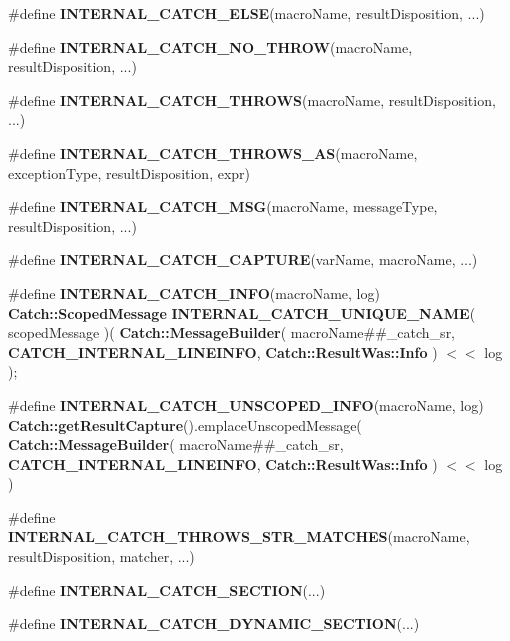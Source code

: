 \begin{DoxyCompactItemize}
\item 
\#define \textbf{ I\+N\+T\+E\+R\+N\+A\+L\+\_\+\+C\+A\+T\+C\+H\+\_\+\+E\+L\+SE}(macro\+Name,  result\+Disposition, ...)
\item 
\#define \textbf{ I\+N\+T\+E\+R\+N\+A\+L\+\_\+\+C\+A\+T\+C\+H\+\_\+\+N\+O\+\_\+\+T\+H\+R\+OW}(macro\+Name,  result\+Disposition, ...)
\item 
\#define \textbf{ I\+N\+T\+E\+R\+N\+A\+L\+\_\+\+C\+A\+T\+C\+H\+\_\+\+T\+H\+R\+O\+WS}(macro\+Name,  result\+Disposition, ...)
\item 
\#define \textbf{ I\+N\+T\+E\+R\+N\+A\+L\+\_\+\+C\+A\+T\+C\+H\+\_\+\+T\+H\+R\+O\+W\+S\+\_\+\+AS}(macro\+Name,  exception\+Type,  result\+Disposition,  expr)
\item 
\#define \textbf{ I\+N\+T\+E\+R\+N\+A\+L\+\_\+\+C\+A\+T\+C\+H\+\_\+\+M\+SG}(macro\+Name,  message\+Type,  result\+Disposition, ...)
\item 
\#define \textbf{ I\+N\+T\+E\+R\+N\+A\+L\+\_\+\+C\+A\+T\+C\+H\+\_\+\+C\+A\+P\+T\+U\+RE}(var\+Name,  macro\+Name, ...)
\item 
\#define \textbf{ I\+N\+T\+E\+R\+N\+A\+L\+\_\+\+C\+A\+T\+C\+H\+\_\+\+I\+N\+FO}(macro\+Name,  log)~\textbf{ Catch\+::\+Scoped\+Message} \textbf{ I\+N\+T\+E\+R\+N\+A\+L\+\_\+\+C\+A\+T\+C\+H\+\_\+\+U\+N\+I\+Q\+U\+E\+\_\+\+N\+A\+ME}( scoped\+Message )( \textbf{ Catch\+::\+Message\+Builder}( macro\+Name\#\#\+\_\+catch\+\_\+sr, \textbf{ C\+A\+T\+C\+H\+\_\+\+I\+N\+T\+E\+R\+N\+A\+L\+\_\+\+L\+I\+N\+E\+I\+N\+FO}, \textbf{ Catch\+::\+Result\+Was\+::\+Info} ) $<$$<$ log );
\item 
\#define \textbf{ I\+N\+T\+E\+R\+N\+A\+L\+\_\+\+C\+A\+T\+C\+H\+\_\+\+U\+N\+S\+C\+O\+P\+E\+D\+\_\+\+I\+N\+FO}(macro\+Name,  log)~\textbf{ Catch\+::get\+Result\+Capture}().emplace\+Unscoped\+Message( \textbf{ Catch\+::\+Message\+Builder}( macro\+Name\#\#\+\_\+catch\+\_\+sr, \textbf{ C\+A\+T\+C\+H\+\_\+\+I\+N\+T\+E\+R\+N\+A\+L\+\_\+\+L\+I\+N\+E\+I\+N\+FO}, \textbf{ Catch\+::\+Result\+Was\+::\+Info} ) $<$$<$ log )
\item 
\#define \textbf{ I\+N\+T\+E\+R\+N\+A\+L\+\_\+\+C\+A\+T\+C\+H\+\_\+\+T\+H\+R\+O\+W\+S\+\_\+\+S\+T\+R\+\_\+\+M\+A\+T\+C\+H\+ES}(macro\+Name,  result\+Disposition,  matcher, ...)
\item 
\#define \textbf{ I\+N\+T\+E\+R\+N\+A\+L\+\_\+\+C\+A\+T\+C\+H\+\_\+\+S\+E\+C\+T\+I\+ON}(...)
\item 
\#define \textbf{ I\+N\+T\+E\+R\+N\+A\+L\+\_\+\+C\+A\+T\+C\+H\+\_\+\+D\+Y\+N\+A\+M\+I\+C\+\_\+\+S\+E\+C\+T\+I\+ON}(...)
\item 

\end{DoxyCompactItemize}
